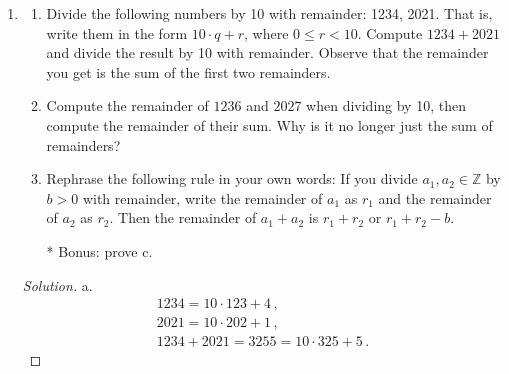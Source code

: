 \documentclass[12pt]{amsart}
\begin{document}
\begin{enumerate}[label=\arabic*.,itemsep=10pt, leftmargin=*]
\begin{proof}[Solution]
        b. By part (a), $\gcd(12, -30) = \gcd(12, 30)$. Therefore, we can apply 
        Euclid's algorithm
        \begin{gather*}
            30 = 2 \cdot 12 + 6 \\
            12 = 2\cdot 6 + 0 \,.
        \end{gather*}
        So $\gcd(12,-30) = 6$.

        c. 
        \begin{gather*}
            12345 = 1\cdot 11100 + 1245 \\
            11100 = 8\cdot 1245 + 1140 \\
            1245 = 1\cdot 1140 + 105 \\
            1140 = 10 \cdot 105 + 90 \\
            105 = 1\cdot 90 + 15 \\
            90 = 60\cdot 15 + 0 \,.
        \end{gather*}
        Thus, $\gcd(12345, 11100) = 15 $.
    \end{proof}

\item
    \begin{enumerate}[label=\alph*.,itemsep=5pt, leftmargin=*]
    \item Divide the following numbers by 10 with remainder: 1234, 2021. That is, write them in the form $10\cdot q + r$, where $0 \leq r < 10$. Compute $1234 + 2021$ and divide the result by 10 with remainder. Observe that the remainder you get is the sum of the first two remainders.
    \item Compute the remainder of $1236$ and $2027$ when dividing by 10, then compute the remainder of their sum. Why is it no longer just the sum of remainders?
    \item Rephrase the following rule in your own words: If you divide $a_1, a_2 \in \mathbb Z$ by $b>0$ with remainder, write the remainder of $a_1$ as $r_1$ and the remainder of $a_2$ as $r_2$. Then the remainder of $a_1 + a_2$ is $r_1 + r_2$ or $r_1 + r_2 - b$.
    
    \item[*]
    Bonus: prove c.
    \end{enumerate}
    \begin{proof}[Solution]
        a.
        \begin{gather*}
           1234 = 10\cdot 123 + 4  \,, \\
           2021 = 10 \cdot 202 + 1  \,, \\
           1234 + 2021 = 3255 = 10 \cdot 325 + 5 \,.
        \end{gather*}


\end{proof}
\end{enumerate}
\end{document}
